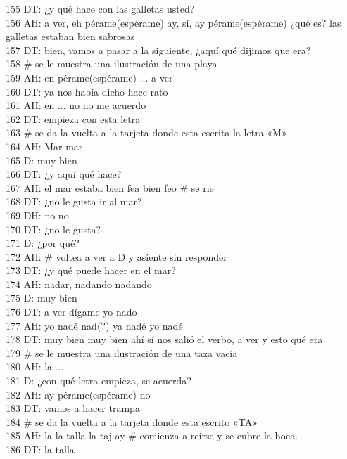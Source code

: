 155 DT: ¿y qué hace con las galletas usted?\\
156 AH: a ver, eh pérame(espérame) ay, sí, ay pérame(espérame) ¿qué es? las galletas estaban bien sabrosas\\
157 DT: bien, vamos a pasar a la siguiente, ¿aquí qué dijimos que era?\\
158 \# se le muestra una ilustración de una playa\\
159 AH: en pérame(espérame) ... a ver\\
160 DT: ya nos había dicho hace rato\\
161 AH: en ... no no me acuerdo\\
162 DT: empieza con esta letra\\
163 \# se da la vuelta a la tarjeta donde esta escrita la letra «M»\\
164 AH: Mar mar\\
165 D: muy bien\\
166 DT: ¿y aquí qué hace?\\
167 AH: el mar estaba bien fea bien feo \# se rie\\
168 DT: ¿no le gusta ir al mar?\\
169 DH: no no\\
170 DT: ¿no le gusta?\\
171 D: ¿por qué?\\
172 AH: \# voltea a ver a D y asiente sin responder\\
173 DT: ¿y qué puede hacer en el mar?\\
174 AH: nadar, nadando nadando\\
175 D: muy bien\\
176 DT: a ver dígame yo nado\\
177 AH: yo nadé nad(?) ya nadé yo nadé\\
178 DT: muy bien muy bien ahí sí nos salió el verbo, a ver y esto qué era\\
179 \# se le muestra una ilustración de una taza vacía\\
180 AH: la ...\\
181 D: ¿con qué letra empieza, se acuerda?\\
182 AH: ay pérame(espérame) no\\
183 DT: vamos a hacer trampa\\
184 \# se da la vuelta a la tarjeta donde esta escrito «TA»\\
185 AH: la la talla la taj ay \# comienza a reirse y se cubre la boca.\\
186 DT: la talla\\
